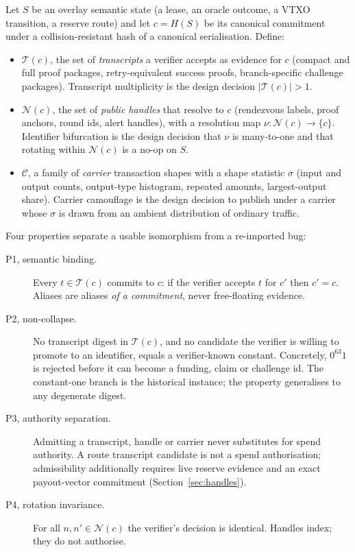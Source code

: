 \documentclass[11pt]{article}
\begin{document}
Let $S$ be an overlay semantic state (a lease, an oracle outcome, a VTXO
transition, a reserve route) and let $c = H(S)$ be its canonical commitment
under a collision-resistant hash of a canonical serialisation. Define:

\begin{itemize}
\item $\mathcal{T}(c)$, the set of \emph{transcripts} a verifier accepts as
evidence for $c$ (compact and full proof packages, retry-equivalent success
proofs, branch-specific challenge packages). Transcript multiplicity is the
design decision $|\mathcal{T}(c)| > 1$.
\item $\mathcal{N}(c)$, the set of \emph{public handles} that resolve to $c$
(rendezvous labels, proof anchors, round ids, alert handles), with a resolution
map $\nu : \mathcal{N}(c) \to \{c\}$. Identifier bifurcation is the design
decision that $\nu$ is many-to-one and that rotating within $\mathcal{N}(c)$ is
a no-op on $S$.
\item $\mathcal{C}$, a family of \emph{carrier} transaction shapes with a shape
statistic $\sigma$ (input and output counts, output-type histogram, repeated
amounts, largest-output share). Carrier camouflage is the design decision to
publish under a carrier whose $\sigma$ is drawn from an ambient distribution of
ordinary traffic.
\end{itemize}

Four properties separate a usable isomorphism from a re-imported bug:

\begin{description}
\item[P1, semantic binding.] Every $t \in \mathcal{T}(c)$ commits to $c$: if the
verifier accepts $t$ for $c'$ then $c' = c$. Aliases are aliases \emph{of a
commitment}, never free-floating evidence.
\item[P2, non-collapse.] No transcript digest in $\mathcal{T}(c)$, and no
candidate the verifier is willing to promote to an identifier, equals a
verifier-known constant. Concretely, $0^{63}1$ is rejected before it can become
a funding, claim or challenge id. The constant-one branch is the historical
instance; the property generalises to any degenerate digest.
\item[P3, authority separation.] Admitting a transcript, handle or carrier never
substitutes for spend authority. A route transcript candidate is not a spend
authorisation; admissibility additionally requires live reserve evidence and an
exact payout-vector commitment (Section~\ref{sec:handles}).
\item[P4, rotation invariance.] For all $n, n' \in \mathcal{N}(c)$ the
verifier's decision is identical. Handles index; they do not authorise.
\end{description}
\end{document}
